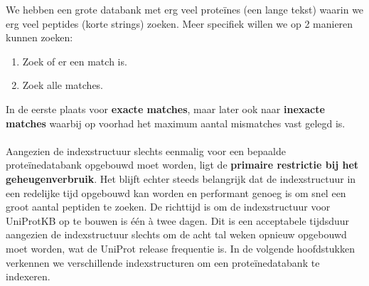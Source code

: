 We hebben een grote databank met erg veel proteïnes (een lange tekst) waarin we erg veel peptides (korte strings) zoeken.
Meer specifiek willen we op 2 manieren kunnen zoeken:
\begin{enumerate}
    \item Zoek of er een match is.
    \item Zoek alle matches.
\end{enumerate}
In de eerste plaats voor \textbf{exacte matches}, maar later ook naar \textbf{inexacte matches} waarbij op voorhad het maximum aantal mismatches vast gelegd is.
\\ \\
Aangezien de indexstructuur slechts eenmalig voor een bepaalde proteïnedatabank opgebouwd moet worden, ligt de \textbf{primaire restrictie bij het geheugenverbruik}.
Het blijft echter steeds belangrijk dat de indexstructuur in een redelijke tijd opgebouwd kan worden en performant genoeg is om snel een groot aantal peptiden te zoeken.
De richttijd is om de indexstructuur voor UniProtKB op te bouwen is één à twee dagen.
Dit is een acceptabele tijdsduur aangezien de indexstructuur slechts om de acht tal weken opnieuw opgebouwd moet worden, wat de UniProt release frequentie is.
In de volgende hoofdstukken verkennen we verschillende indexstructuren om een proteïnedatabank te indexeren.


